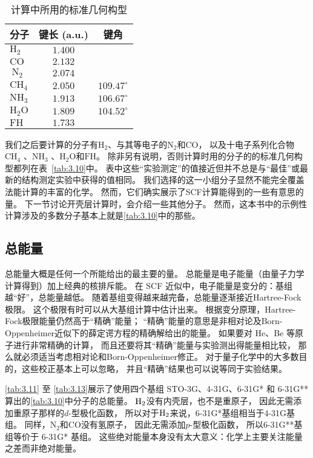 \begin{table}\centering
	\caption{计算中所用的标准几何构型}
	\begin{tabular}{lcc}
		\hline 分子 & 键长 (a.u.) & 键角 \\
		\hline $\mathrm{H}_2$ & $1.400$ & \\
		$\mathrm{CO}$ & $2.132$ & \\
		$\mathrm{~N}_2$ & $2.074$ & \\
		$\mathrm{CH}_4$ & $2.050$ & $109.47^{\circ}$ \\
		$\mathrm{NH}_3$ & $1.913$ & $106.67^{\circ}$ \\
		$\mathrm{H}_2 \mathrm{O}$ & $1.809$ & $104.52^{\circ}$ \\
		$\mathrm{FH}$ & $1.733$ & \\
		\hline
	\end{tabular}
\label{tab:3.10}
\end{table}

我们之后要计算的分子有$\mathrm{H}_2$、与其等电子的$\mathrm{N}_2$和$\mathrm{CO}$，
以及十电子系列化合物$\mathrm{CH}_4$ 、$\mathrm{NH_3}$ 、$\mathrm{H_2O}$和$\mathrm{FH}$。 
除非另有说明，否则计算时用的分子的的标准几何构型都列在表~\autoref{tab:3.10}中。 
表中这些“实验测定”的值接近但并不总是与“最佳”或最新的结构测定实验中获得的值相同。 
我们选择的这一小组分子显然不能完全覆盖法能计算的丰富的化学。 
然而，它们确实展示了SCF计算能得到的一些有意思的量。 
下一节讨论开壳层计算时，会介绍一些其他分子。
然而，这本书中的示例性计算涉及的多数分子基本上就是\autoref{tab:3.10}中的那些。

\subsection{总能量}
总能量大概是任何一个所能给出的最主要的量。 
总能量是电子能量（由量子力学计算得到）加上经典的核排斥能。
在 SCF 近似中，电子能量是变分的：基组越“好”，总能量越低。
随着基组变得越来越完备，总能量逐渐接近Hartree-Fock 极限。 
这个极限有时可以从大基组计算中估计出来。
根据变分原理，Hartree-Fock极限能量仍然高于“精确”能量；
“精确”能量的意思是非相对论及Born-Oppenheimer近似下的薛定谔方程的精确解给出的能量。 
如果要对 He、Be 等原子进行非常精确的计算，
而且还要将其“精确”能量与实验测出得能量相比较，
那么就必须适当考虑相对论和Born-Oppenheimer修正。
对于量子化学中的大多数目的，这些校正基本上可以忽略，
并且“精确”结果也可以说等同于实验结果。


\autoref{tab:3.11} 至 \autoref{tab:3.13}展示了使用四个基组
STO-3G、4-31G、6-31G* 和 6-31G** 算出的\autoref{tab:3.10}中分子的总能量。
 $\mathrm{H}_2$没有内壳层，也不是重原子，
因此无需添加重原子那样的$d$-型极化函数，
所以对于$\mathrm{H}_2$来说，6-31G*基组相当于4-31G基组。
同样，$\mathrm{N_2}$和$\mathrm{CO}$没有氢原子，
因此无需添加$p$-型极化函数，
所以6-31G**基组等价于 6-31G* 基组。
这些绝对能量本身没有太大意义：化学上主要关注能量之差而非绝对能量。

